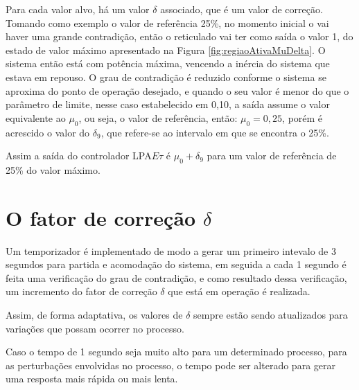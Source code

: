 Para cada valor alvo, há um valor $\delta$ associado, 
que é um valor de correção.
Tomando como exemplo o valor de referência 25\%, 
no momento inicial o vai haver uma grande contradição,
então o reticulado vai ter como saída o valor 1, 
do estado de valor máximo apresentado na 
Figura \ref{fig:regiaoAtivaMuDelta}.
O sistema então está com potência máxima, 
vencendo a inércia do sistema que estava em repouso.
O grau de contradição é reduzido conforme 
o sistema se aproxima do ponto de operação desejado,
e quando o seu valor é menor do que 
o parâmetro de limite, nesse caso estabelecido em 0,10,
a saída assume o valor equivalente ao $\mu_0$, ou seja,
o valor de referência, então: $\mu_0 = 0,25$, porém 
é acrescido o valor do $\delta_9$, 
que refere-se ao intervalo em que se encontra o 25\%.

Assim a saída do controlador LPA$E\tau$ é 
$\mu_0 + \delta_9$
para um valor de referência de 25\% do valor máximo.










\section{O fator de correção $\delta$}

Um temporizador é implementado de modo a 
gerar um primeiro intevalo de 3 segundos para 
partida e acomodação do sistema, 
em seguida a cada 1 segundo é feita uma verificação
do grau de contradição, 
e como resultado dessa verificação, 
um incremento do fator de correção $\delta$ 
que está em operação é realizada. 

Assim, de forma adaptativa, 
os valores de $\delta$ sempre estão sendo atualizados
para variações que possam ocorrer no processo. 

Caso o tempo de 1 segundo seja muito alto para um 
determinado processo, 
para as perturbações envolvidas no processo,
o tempo pode ser alterado para gerar uma resposta 
mais rápida ou mais lenta. 










